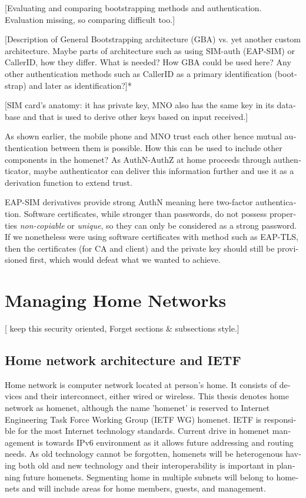 \documentclass[12pt,a4paper,english]{tutthesis}
\begin{document}
\begin{otherlanguage}{english}
 [Evaluating and comparing bootstrapping methods and authentication.
Evaluation missing, so comparing difficult too.]

[Description of General Bootstrapping architecture (GBA) vs. yet
another custom architecture. Maybe parts of architecture
such as using SIM-auth (EAP-SIM) or CallerID, how they differ. 
What is needed? How GBA could be used here?
Any other authentication methods such as CallerID
as a primary identification (bootstrap) and later as identification?]*

[SIM card's anatomy: it has private key, MNO
also has the same key in its database and that is used to derive
other keys based on input received.]


As shown earlier, 
the mobile phone and MNO trust each other hence mutual authentication
between them  is possible.
  How this can be used to include other components in the homenet? As AuthN-AuthZ at home
proceeds through authenticator, maybe authenticator can deliver this information
further and use it as a derivation function to extend trust.

EAP-SIM derivatives provide strong AuthN meaning here two-factor
authentication. Software certificates, while stronger than passwords,
do not possess properties \emph{non-copiable} or \emph{unique}, so they can only
be considered as a strong password.  
If we nonetheless were using software certificates with method such as
EAP-TLS, then the certificates (for CA and client) and the private key
should still be provisioned first, which would defeat what we wanted
to achieve.
\chapter{Managing Home Networks}
\label{sec-3}
[ keep this security oriented, Forget sections \& subsections style.]

\section{Home network architecture and IETF}
\label{sec-3-1}


Home network is computer network located at person's home. It consists
of devices and their interconnect, either wired or wireless.  This
thesis denotes home network as homenet, although the name 'homenet'
is reserved to Internet Engineering Task Force Working Group (IETF WG) homenet.
IETF is responsible for the most Internet technology standards.
Current drive in homenet management is towards IPv6 environment
 as it allows future  addressing and routing needs. As old technology
cannot be forgotten, homenets will be heterogenous having both
old and new technology and their interoperability is important in
planning future homenets. Segmenting home in multiple subnets will belong
to homenets and will include areas for home members, guests,
and management.




\end{otherlanguage}
\end{document}
